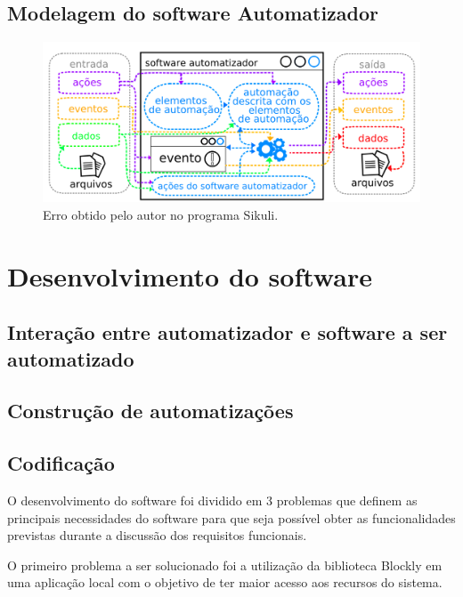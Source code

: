 \documentclass[tg]{mdtufsm}
\begin{document}
            \subsection{Modelagem do software Automatizador}

                \begin{figure}[!htb]
                    {\centering
                    \includegraphics[width=1.0\textwidth]{imagens/automatIO}
                    \caption{Erro obtido pelo autor no programa Sikuli.}
                    \label{fig:automatIO}}
                \end{figure}

        \section {Desenvolvimento do software}

            \subsection {Interação entre automatizador e software a ser automatizado}

            \subsection {Construção de automatizações}

            \subsection {Codificação}

                O desenvolvimento do software foi dividido em 3 problemas que definem as principais necessidades do software para que seja possível obter as funcionalidades previstas durante a discussão dos requisitos funcionais.

                O primeiro problema a ser solucionado foi a utilização da biblioteca Blockly em uma aplicação local com o objetivo de ter maior acesso aos recursos do sistema.
\end{document}
